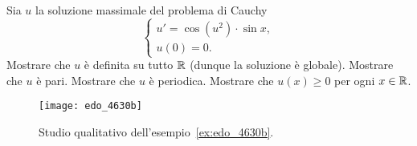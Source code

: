 \begin{example}\label{ex:edo_4630b}
Sia $u$ la soluzione massimale del problema di Cauchy
\[
	\begin{cases}
		u' = \cos(u^2)\cdot \sin x, \\
		u(0) = 0.
	\end{cases}
\]
Mostrare che $u$
è definita su tutto ${\mathbb R}$ (dunque la soluzione è globale).
Mostrare che $u$ è pari.
Mostrare che $u$ è periodica.
Mostrare che $u(x)\ge 0$ per ogni $x\in {\mathbb R}$.
\end{example}
\newsavebox{\qredoquattro}
\begin{figure}
  \centering\texttt{[image: edo\_4630b]}
  \caption{Studio qualitativo dell'esempio~\ref{ex:edo_4630b}.
  \ifwidemargin\\\\\fi%
  \usebox{\qredoquattro}}
  \label{fig:edo_4630b}
\end{figure}
%
